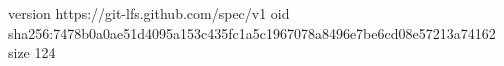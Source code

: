 version https://git-lfs.github.com/spec/v1
oid sha256:7478b0a0ae51d4095a153c435fc1a5c1967078a8496e7be6cd08e57213a74162
size 124
